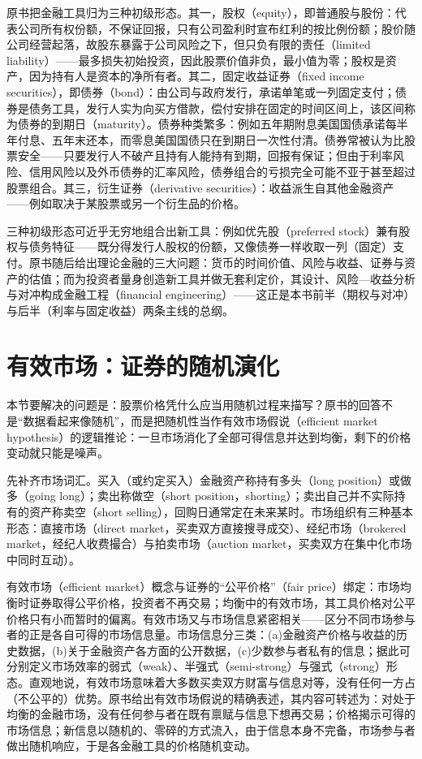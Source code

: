 原书把金融工具归为三种初级形态。其一，股权（equity），即普通股与股份：代表公司所有权份额，不保证回报，只有公司盈利时宣布红利的按比例份额；股价随公司经营起落，故股东暴露于公司风险之下，但只负有限的责任（limited liability）——最多损失初始投资，因此股票价值非负，最小值为零；股权是资产，因为持有人是资本的净所有者。其二，固定收益证券（fixed income securities），即债券（bond）：由公司与政府发行，承诺单笔或一列固定支付；债券是债务工具，发行人实为向买方借款，偿付安排在固定的时间区间上，该区间称为债券的到期日（maturity）。债券种类繁多：例如五年期附息美国国债承诺每半年付息、五年末还本，而零息美国国债只在到期日一次性付清。债券常被认为比股票安全——只要发行人不破产且持有人能持有到期，回报有保证；但由于利率风险、信用风险以及外币债券的汇率风险，债券组合的亏损完全可能不亚于甚至超过股票组合。其三，衍生证券（derivative securities）：收益派生自其他金融资产——例如取决于某股票或另一个衍生品的价格。

三种初级形态可近乎无穷地组合出新工具：例如优先股（preferred stock）兼有股权与债务特征——既分得发行人股权的份额，又像债券一样收取一列（固定）支付。原书随后给出理论金融的三大问题：货币的时间价值、风险与收益、证券与资产的估值；而为投资者量身创造新工具并做无套利定价，其设计、风险—收益分析与对冲构成金融工程（financial engineering）——这正是本书前半（期权与对冲）与后半（利率与固定收益）两条主线的总纲。

\section{有效市场：证券的随机演化}

本节要解决的问题是：股票价格凭什么应当用随机过程来描写？原书的回答不是“数据看起来像随机”，而是把随机性当作有效市场假说（efficient market hypothesis）的逻辑推论：一旦市场消化了全部可得信息并达到均衡，剩下的价格变动就只能是噪声。

先补齐市场词汇。买入（或约定买入）金融资产称持有多头（long position）或做多（going long）；卖出称做空（short position，shorting）；卖出自己并不实际持有的资产称卖空（short selling），回购日通常定在未来某时。市场组织有三种基本形态：直接市场（direct market，买卖双方直接搜寻成交）、经纪市场（brokered market，经纪人收费撮合）与拍卖市场（auction market，买卖双方在集中化市场中同时互动）。

有效市场（efficient market）概念与证券的“公平价格”（fair price）绑定：市场均衡时证券取得公平价格，投资者不再交易；均衡中的有效市场，其工具价格对公平价格只有小而暂时的偏离。有效市场又与市场信息紧密相关——区分不同市场参与者的正是各自可得的市场信息量。市场信息分三类：(a)金融资产价格与收益的历史数据，(b)关于金融资产各方面的公开数据，(c)少数参与者私有的信息；据此可分别定义市场效率的弱式（weak）、半强式（semi-strong）与强式（strong）形态。直观地说，有效市场意味着大多数买卖双方财富与信息对等，没有任何一方占（不公平的）优势。原书给出有效市场假说的精确表述，其内容可转述为：对处于均衡的金融市场，没有任何参与者在既有禀赋与信息下想再交易；价格揭示可得的市场信息；新信息以随机的、零碎的方式流入，由于信息本身不完备，市场参与者做出随机响应，于是各金融工具的价格随机变动。

